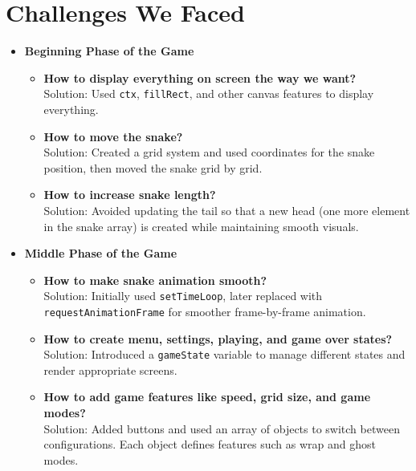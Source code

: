 \section{Challenges We Faced}
\begin{itemize}
 
\item \textbf{Beginning Phase of the Game}

\begin{itemize}

\item \textbf{How to display everything on screen the way we want?} \\
Solution: Used \texttt{ctx}, \texttt{fillRect}, and other canvas features to display everything.

\item \textbf{How to move the snake?} \\
Solution: Created a grid system and used coordinates for the snake position, then moved the snake grid by grid.

\item \textbf{How to increase snake length?} \\
Solution: Avoided updating the tail so that a new head (one more element in the snake array) is created while maintaining smooth visuals.

\end{itemize}

\item \textbf{Middle Phase of the Game}

\begin{itemize}

\item \textbf{How to make snake animation smooth?} \\
Solution: Initially used \texttt{setTimeLoop}, later replaced with \texttt{requestAnimationFrame} for smoother frame-by-frame animation.

\item \textbf{How to create menu, settings, playing, and game over states?} \\
Solution: Introduced a \texttt{gameState} variable to manage different states and render appropriate screens.

\item \textbf{How to add game features like speed, grid size, and game modes?} \\
Solution: Added buttons and used an array of objects to switch between configurations. Each object defines features such as wrap and ghost modes.


\end{itemize}
\end{itemize}
